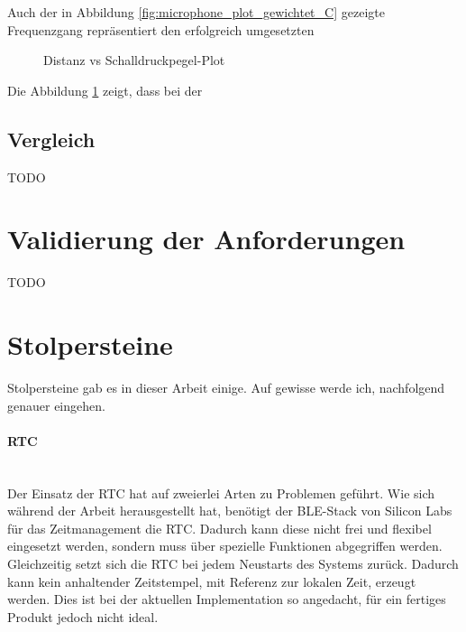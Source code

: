 \documentclass[12pt]{article}
\begin{document}
		Auch der in Abbildung \ref{fig:microphone_plot_gewichtet_C} gezeigte Frequenzgang repräsentiert den erfolgreich umgesetzten 
		\begin{figure}[H]
		\centering
			\caption{Distanz vs Schalldruckpegel-Plot}
			\label{fig:microphone_plot_distanz}
		\end{figure}
		Die Abbildung \ref{fig:microphone_plot_distanz} zeigt, dass bei der 
	\subsection{Vergleich}
	\color{red}TODO\color{black}
	
	\newpage
	\section{Validierung der Anforderungen}
	\color{red}TODO\color{black}
	
	\newpage
	\section{Stolpersteine}
	Stolpersteine gab es in dieser Arbeit einige. Auf gewisse werde ich, nachfolgend genauer eingehen.
	\paragraph{RTC}\mbox{}\\
	Der Einsatz der RTC hat auf zweierlei Arten zu Problemen geführt. Wie sich während der Arbeit herausgestellt hat, benötigt der BLE-Stack von Silicon Labs für das Zeitmanagement die RTC. Dadurch kann diese nicht frei und flexibel eingesetzt werden, sondern muss über spezielle Funktionen abgegriffen werden. Gleichzeitig setzt sich die RTC bei jedem Neustarts des Systems zurück. Dadurch kann kein anhaltender Zeitstempel, mit Referenz zur lokalen Zeit, erzeugt werden. Dies ist bei der aktuellen Implementation so angedacht, für ein fertiges Produkt jedoch nicht ideal.
\end{document}
